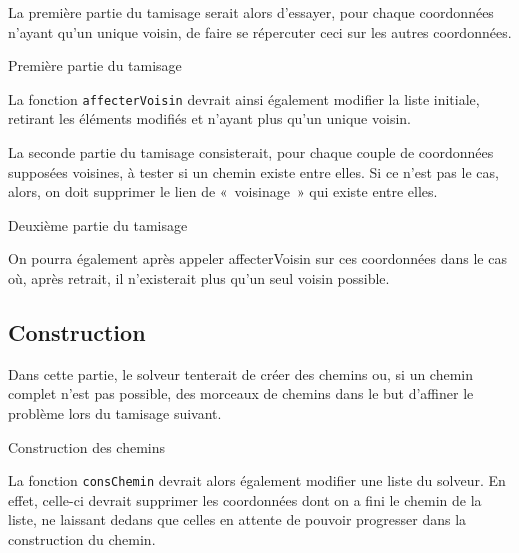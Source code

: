 La première partie du tamisage serait alors d'essayer, pour chaque coordonnées n'ayant qu'un unique voisin, de faire se répercuter ceci sur les autres coordonnées. 

\begin{algorithm}[H]
  \caption{Première partie du tamisage}
\end{algorithm}

La fonction \verb$affecterVoisin$ devrait ainsi également modifier la liste initiale, retirant les éléments modifiés et n'ayant plus qu'un unique voisin.

La seconde partie du tamisage consisterait, pour chaque couple de coordonnées supposées voisines, à tester si un chemin existe entre elles. Si ce n'est pas le cas, alors, on doit supprimer le lien de «~voisinage~» qui existe entre elles.

\begin{algorithm}[H]
  \caption{Deuxième partie du tamisage}
\end{algorithm}

On pourra également après appeler affecterVoisin sur ces coordonnées dans le cas où, après retrait, il n'existerait plus qu'un seul voisin possible.

\subsection{Construction}

Dans cette partie, le solveur tenterait de créer des chemins ou, si un chemin complet n'est pas possible, des morceaux de chemins dans le but d'affiner le problème lors du tamisage suivant.

\begin{algorithm}[H]
  \caption{Construction des chemins}
\end{algorithm}

La fonction \verb$consChemin$ devrait alors également modifier une liste du solveur. En effet, celle-ci devrait supprimer les coordonnées dont on a fini le chemin de la liste, ne laissant dedans que celles en attente de pouvoir progresser dans la construction du chemin.
